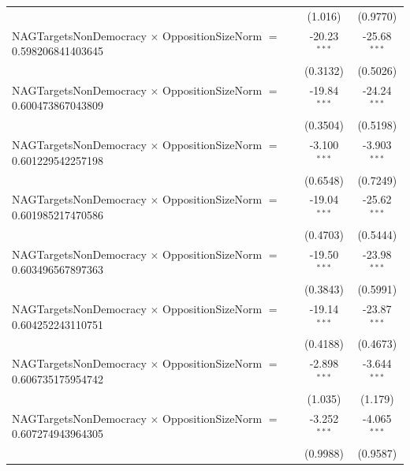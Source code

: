 \begin{tabular}{lcc}
                                                                                & (1.016)              & (0.9770)\\   
   NAGTargetsNonDemocracy $\times$ OppositionSizeNorm $=$ 0.598206841403645     & -20.23$^{***}$       & -25.68$^{***}$\\   
                                                                                & (0.3132)             & (0.5026)\\   
   NAGTargetsNonDemocracy $\times$ OppositionSizeNorm $=$ 0.600473867043809     & -19.84$^{***}$       & -24.24$^{***}$\\   
                                                                                & (0.3504)             & (0.5198)\\   
   NAGTargetsNonDemocracy $\times$ OppositionSizeNorm $=$ 0.601229542257198     & -3.100$^{***}$       & -3.903$^{***}$\\   
                                                                                & (0.6548)             & (0.7249)\\   
   NAGTargetsNonDemocracy $\times$ OppositionSizeNorm $=$ 0.601985217470586     & -19.04$^{***}$       & -25.62$^{***}$\\   
                                                                                & (0.4703)             & (0.5444)\\   
   NAGTargetsNonDemocracy $\times$ OppositionSizeNorm $=$ 0.603496567897363     & -19.50$^{***}$       & -23.98$^{***}$\\   
                                                                                & (0.3843)             & (0.5991)\\   
   NAGTargetsNonDemocracy $\times$ OppositionSizeNorm $=$ 0.604252243110751     & -19.14$^{***}$       & -23.87$^{***}$\\   
                                                                                & (0.4188)             & (0.4673)\\   
   NAGTargetsNonDemocracy $\times$ OppositionSizeNorm $=$ 0.606735175954742     & -2.898$^{***}$       & -3.644$^{***}$\\   
                                                                                & (1.035)              & (1.179)\\   
   NAGTargetsNonDemocracy $\times$ OppositionSizeNorm $=$ 0.607274943964305     & -3.252$^{***}$       & -4.065$^{***}$\\   
                                                                                & (0.9988)             & (0.9587)\\   

\end{tabular}
